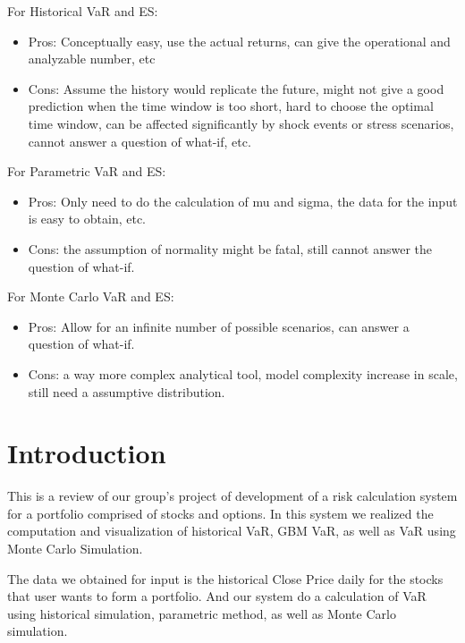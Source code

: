 \documentclass[letterpaper,11pt, oneside]{layout}
\begin{document}
For Historical VaR and ES: 
\begin{itemize}
\item Pros: Conceptually easy, use the actual returns, can give the operational and analyzable number, etc
\item Cons: Assume the history would replicate the future, might not give a good prediction when the time window is too short, hard to choose the optimal time window, can be affected significantly by shock events or stress scenarios, cannot answer a question of what-if, etc.
\end{itemize}

For Parametric VaR and ES: 
\begin{itemize}
\item Pros: Only need to do the calculation of mu and sigma, the data for the input is easy to obtain, etc.
\item Cons: the assumption of normality might be fatal, still cannot answer the question of what-if.
\end{itemize}

For Monte Carlo VaR and ES: 
\begin{itemize}
\item Pros: Allow for an infinite number of possible scenarios, can answer a question of what-if.
\item Cons: a way more complex analytical tool, model complexity increase in scale, still need a assumptive distribution. 
\end{itemize}


\begingroup
\renewcommand{\clearpage}{}
\chapter{Introduction}
\label{chap:intro}
\endgroup
This is a review of our group’s project of development of a risk calculation system for a portfolio comprised of stocks and options. In this system we realized the computation and visualization of historical VaR, GBM VaR, as well as VaR using Monte Carlo Simulation. 

The data we obtained for input is the historical Close Price daily for the stocks that user wants to form a portfolio. And our system do a calculation of VaR using historical simulation, parametric method, as well as Monte Carlo simulation.


\end{document}
